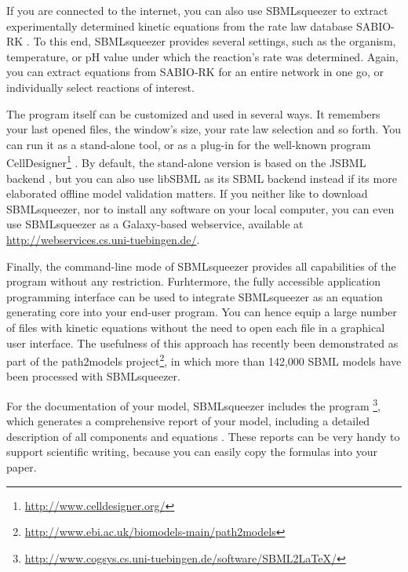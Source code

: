 If you are connected to the internet, you can also use SBMLsqueezer to extract
experimentally determined kinetic equations from the rate law database SABIO-RK
\citep[System for the Analysis of Biochemical Pathways -- Reaction Kinetics,][]{
Wittig2006, Rojas2007, Krebs2007, Wittig2012}.
To this end, SBMLsqueezer provides several settings, such as the organism,
temperature, or pH value under which the reaction's rate was determined. Again,
you can extract equations from SABIO-RK for an entire network in one go, or
individually select reactions of interest.

The program itself can be customized and used in several ways. It remembers your
last opened files, the window's size, your rate law selection and so forth.
You can run it as a stand-alone tool, or as a plug-in for the well-known program
CellDesigner\footnote{\url{http://www.celldesigner.org/}}
\citep{Funahashi2003, Funahashi2006, Funahashi2007a, Funahashi2008}.
By default, the stand-alone version is based on the JSBML backend 
\citep{Draeger2011b}, but you can also use libSBML \citep{Bornstein2008} as its
SBML backend instead if its more elaborated offline model validation matters.
If you neither like to download SBMLsqueezer, nor to install any software on
your local computer, you can even use SBMLsqueezer as a Galaxy-based webservice,
available at \url{http://webservices.cs.uni-tuebingen.de/}. 

Finally, the command-line mode of SBMLsqueezer provides all capabilities of the
program without any restriction.
Furhtermore, the fully accessible application programming interface can be used
to integrate SBMLsqueezer as an equation generating core into your end-user
program.
You can hence equip a large number of files with kinetic equations without the
need to open each file in a graphical user interface.
The usefulness of this approach has recently been demonstrated as part of the
path2models project\footnote{\url{http://www.ebi.ac.uk/biomodels-main/path2models}},
in which more than 142,000 SBML models have been processed with SBMLsqueezer.

For the documentation of your model, SBMLsqueezer includes the program
\SBMLLaTeX\footnote{\url{http://www.cogsys.cs.uni-tuebingen.de/software/SBML2LaTeX/}},
which generates a comprehensive report of your model, including a detailed
description of all components and equations \citep{Draeger2009b, Draeger2010a}.
These reports can be very handy to support scientific writing, because you can
easily copy the formulas into your paper.

